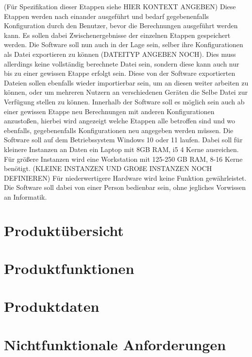 \documentclass[parskip=full]{scrartcl} %
\begin{document}
(Für Spezifikation dieser Etappen siehe HIER KONTEXT ANGEBEN)
Diese Etappen werden nach einander ausgeführt und bedarf gegebenenfalls Konfiguration durch den Benutzer, bevor die Berechnungen ausgeführt werden kann.
Es sollen dabei Zwischenergebnisse der einzelnen Etappen gespeichert werden.
Die Software soll nun auch in der Lage sein, selber ihre Konfigurationen als Datei exportieren zu können (DATEITYP ANGEBEN NOCH). Dies muss allerdings keine vollständig berechnete Datei sein, sondern diese kann auch nur bis zu einer gewissen Etappe erfolgt sein.
Diese von der Software exportierten Dateien sollen ebenfalls wieder importierbar sein, um an diesen weiter arbeiten zu können, oder um mehreren Nutzern an verschiedenen Geräten die Selbe Datei zur Verfügung stellen zu können.
Innerhalb der Software soll es möglich sein auch ab einer gewissen Etappe neu Berechnungen mit anderen Konfigurationen anzustoßen, hierbei wird angezeigt welche Etappen alle betroffen sind und wo ebenfalls, gegebenenfalls Konfigurationen neu angegeben werden müssen.
Die Software soll auf dem Betriebssystem Windows 10 oder 11 laufen.
Dabei soll für kleinere Instanzen an Daten ein Laptop mit 8GB RAM, i5 4 Kerne ausreichen.
Für größere Instanzen wird eine Workstation mit 125-250 GB RAM, 8-16 Kerne benötigt.
(KLEINE INSTANZEN UND GROßE INSTANZEN NOCH DEFINIEREN)
Für niederwertigere Hardware wird keine Funktion gewährleistet.
Die Software soll dabei von einer Person bedienbar sein, ohne jegliches Vorwissen an Informatik.

\newpage



\section{Produktübersicht}
\newpage



\section{Produktfunktionen}
\newpage



\section{Produktdaten}
\newpage



\section{Nichtfunktionale Anforderungen}
\end{document}
